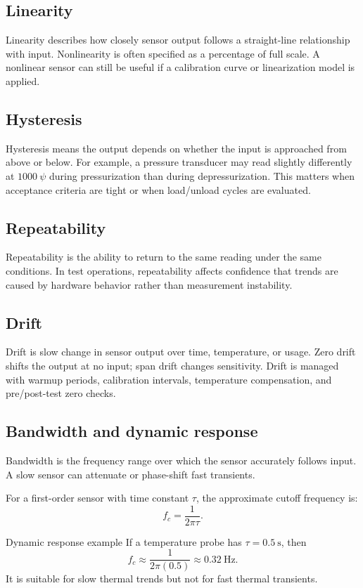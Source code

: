 \documentclass[11pt]{article}
\newcommand{\Hz}{\mathrm{Hz}}
\begin{document}
\subsection{Linearity}
Linearity describes how closely sensor output follows a straight-line
relationship with input. Nonlinearity is often specified as a percentage of full
scale. A nonlinear sensor can still be useful if a calibration curve or
linearization model is applied.

\subsection{Hysteresis}
Hysteresis means the output depends on whether the input is approached from
above or below. For example, a pressure transducer may read slightly differently
at \(1000~\psi\) during pressurization than during depressurization. This matters
when acceptance criteria are tight or when load/unload cycles are evaluated.

\subsection{Repeatability}
Repeatability is the ability to return to the same reading under the same
conditions. In test operations, repeatability affects confidence that trends are
caused by hardware behavior rather than measurement instability.

\subsection{Drift}
Drift is slow change in sensor output over time, temperature, or usage. Zero
drift shifts the output at no input; span drift changes sensitivity. Drift is
managed with warmup periods, calibration intervals, temperature compensation,
and pre/post-test zero checks.

\subsection{Bandwidth and dynamic response}
Bandwidth is the frequency range over which the sensor accurately follows input.
A slow sensor can attenuate or phase-shift fast transients.

For a first-order sensor with time constant \(\tau\), the approximate cutoff
frequency is:
\[
f_c = \frac{1}{2\pi \tau}.
\]

\begin{examplebox}{Dynamic response example}
If a temperature probe has \(\tau = 0.5~\mathrm{s}\), then
\[
f_c \approx \frac{1}{2\pi(0.5)} \approx 0.32~\Hz.
\]
It is suitable for slow thermal trends but not for fast thermal transients.
\end{examplebox}
\end{document}
